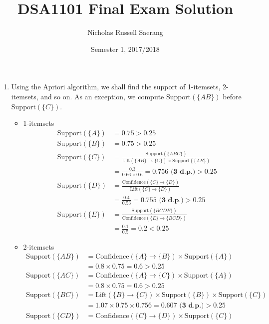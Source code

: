 \documentclass{article}
\title{DSA1101 Final Exam Solution}
\author{Nicholas Russell Saerang}
\date{Semester 1, 2017/2018}
\begin{document}
\maketitle

\begin{enumerate}
    \item
    Using the Apriori algorithm, we shall find the support of 1-itemsets, 2-itemsets, and so on. As an exception, we compute $\text{Support}(\{AB\})$ before $\text{Support}(\{C\})$.
    \begin{itemize}
        \item 1-itemsets
        \begin{align*}
            \text{Support}(\{A\})&=0.75>0.25\\
            \text{Support}(\{B\})&=0.75>0.25\\
            \text{Support}(\{C\})&=\frac{\text{Support}(\{ABC\})}{\text{Lift}(\{AB\}\rightarrow\{C\})\times\text{Support}(\{AB\})}\\
            &=\frac{0.3}{0.66\times0.6}=0.756 \textbf{ (3 d.p.)}> 0.25\\
            \text{Support}(\{D\})&=\frac{\text{Confidence}(\{C\}\rightarrow\{D\})}{\text{Lift}(\{C\}\rightarrow\{D\})}\\
            &= \frac{0.4}{0.53}=0.755 \textbf{ (3 d.p.)} > 0.25\\
            \text{Support}(\{E\})&=\frac{\text{Support}(\{BCDE\})}{\text{Confidence}(\{E\}\rightarrow\{BCD\})}\\
            &=\frac{0.1}{0.5}=0.2<0.25
        \end{align*}
        \item 2-itemsets
        \begin{align*}
            \text{Support}(\{AB\})&=\text{Confidence}(\{A\}\rightarrow\{B\})\times\text{Support}(\{A\})\\
            &=0.8\times0.75 =0.6>0.25\\
            \text{Support}(\{AC\})&=\text{Confidence}(\{A\}\rightarrow\{C\})\times\text{Support}(\{A\})\\
            &=0.8\times0.75 =0.6>0.25\\
            \text{Support}(\{BC\})&=\text{Lift}(\{B\}\rightarrow\{C\})\times\text{Support}(\{B\})\times\text{Support}(\{C\})\\
            &=1.07\times0.75\times0.756=0.607\textbf{ (3 d.p.)} > 0.25\\
            \text{Support}(\{CD\})&=\text{Confidence}(\{C\}\rightarrow\{D\})\times\text{Support}(\{C\})\\

\end{align*}
\end{itemize}
\end{enumerate}
\end{document}
